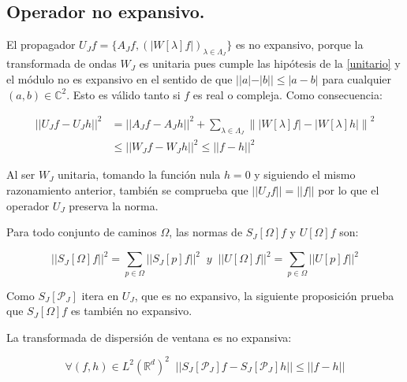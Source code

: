 \subsection{Operador no expansivo.}

\noindent El propagador $U_Jf=\lbrace A_Jf, \left(\left| W[\lambda]f\right|\right)_{\lambda\in\Lambda_J} \rbrace$ es no expansivo, porque la transformada de ondas $W_J$ es unitaria pues cumple las hipótesis de la \autoref{unitario} y el módulo no es expansivo en el sentido de que $||a|-|b||\leq |a-b|$ para cualquier $(a,b)\in \mathbb{C}^2$. Esto es válido tanto si $f$ es real o compleja. Como consecuencia: 

\begin{align*} 
    ||U_J f-U_J h||^2 &= ||A_J f-A_J h||^2+\sum_{\lambda\in\Lambda_J} \left\| |W[\lambda]f|-|W[\lambda]h| \right\|^2 \\
    &\leq \left| \left| W_J f- W_J h \right| \right|^2 \leq ||f-h||^2
\end{align*}

\noindent Al ser $W_J$ unitaria, tomando la función nula $h=0$ y siguiendo el mismo razonamiento anterior, también se comprueba que $||U_J f||=||f||$ por lo que el operador $U_J$ preserva la norma.

\medskip

\noindent Para todo conjunto de caminos $\Omega$, las normas de $S_J[\Omega]f$ y $U[\Omega]f$ son: 

$$\left|\left| S_J[\Omega]f \right|\right|^2=\sum_{p\in\Omega} \left|\left| S_J[p]f\right|\right|^2 \;\; y \;\; \left|\left|U[\Omega]f\right|\right|^2=\sum_{p\in\Omega} \left|\left| U[p]f\right|\right|^2$$

\noindent Como $S_J[\mathcal{P}_J]$ itera en $U_J$, que es no expansivo, la siguiente proposición prueba que $S_J[\Omega]f$ es también no expansivo. 

\begin{proposicion} \label{proposicion::NoExpansiva}
La transformada de dispersión de ventana es no expansiva: 

\begin{equation}
  \forall (f,h)\in L^2(\mathbb{R}^d)^2 \;\; ||S_J[\mathcal{P}_J]f-S_J[\mathcal{P}_J]h|| \leq ||f-h||
\end{equation}
\end{proposicion}

